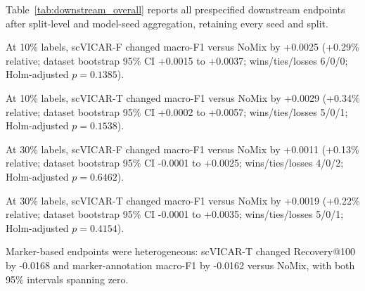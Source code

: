 

Table~\ref{tab:downstream_overall} reports all prespecified downstream endpoints after split-level and model-seed aggregation, retaining every seed and split.

At 10\% labels, scVICAR-F changed macro-F1 versus NoMix by +0.0025 (+0.29\% relative; dataset bootstrap 95\% CI +0.0015 to +0.0037; wins/ties/losses 6/0/0; Holm-adjusted $p=0.1385$).

At 10\% labels, scVICAR-T changed macro-F1 versus NoMix by +0.0029 (+0.34\% relative; dataset bootstrap 95\% CI +0.0002 to +0.0057; wins/ties/losses 5/0/1; Holm-adjusted $p=0.1538$).

At 30\% labels, scVICAR-F changed macro-F1 versus NoMix by +0.0011 (+0.13\% relative; dataset bootstrap 95\% CI -0.0001 to +0.0025; wins/ties/losses 4/0/2; Holm-adjusted $p=0.6462$).

At 30\% labels, scVICAR-T changed macro-F1 versus NoMix by +0.0019 (+0.22\% relative; dataset bootstrap 95\% CI -0.0001 to +0.0035; wins/ties/losses 5/0/1; Holm-adjusted $p=0.4154$).

Marker-based endpoints were heterogeneous: scVICAR-T changed Recovery@100 by -0.0168 and marker-annotation macro-F1 by -0.0162 versus NoMix, with both 95\% intervals spanning zero.
